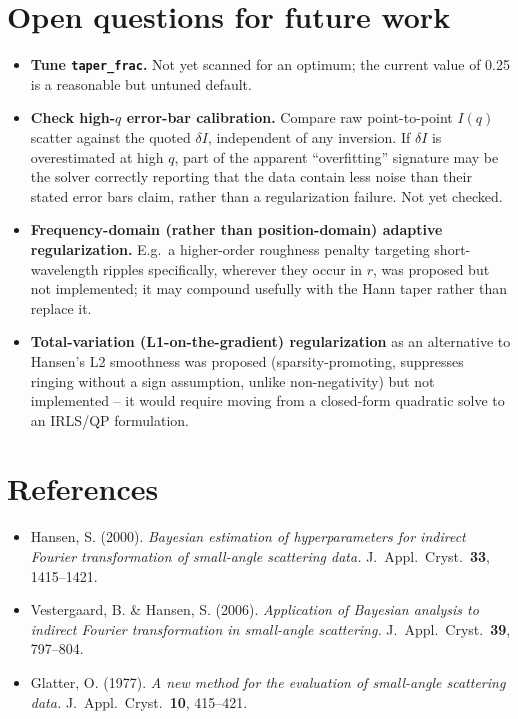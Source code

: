 \documentclass[11pt,a4paper]{article}
\begin{document}
\section{Open questions for future work}
\label{sec:future}

\begin{itemize}[nosep]
  \item \textbf{Tune \texttt{taper\_frac}.} Not yet scanned for an
    optimum; the current value of 0.25 is a reasonable but untuned
    default.
  \item \textbf{Check high-$q$ error-bar calibration.} Compare raw
    point-to-point $I(q)$ scatter against the quoted $\delta I$,
    independent of any inversion. If $\delta I$ is overestimated at
    high $q$, part of the apparent ``overfitting'' signature may be
    the solver correctly reporting that the data contain less noise
    than their stated error bars claim, rather than a regularization
    failure. Not yet checked.
  \item \textbf{Frequency-domain (rather than position-domain) adaptive
    regularization.} E.g.\ a higher-order roughness penalty targeting
    short-wavelength ripples specifically, wherever they occur in $r$,
    was proposed but not implemented; it may compound usefully with
    the Hann taper rather than replace it.
  \item \textbf{Total-variation (L1-on-the-gradient) regularization}
    as an alternative to Hansen's L2 smoothness was proposed
    (sparsity-promoting, suppresses ringing without a sign assumption,
    unlike non-negativity) but not implemented -- it would require
    moving from a closed-form quadratic solve to an IRLS/QP
    formulation.
\end{itemize}

\section*{References}
\begin{itemize}[nosep]
  \item Hansen, S. (2000). \emph{Bayesian estimation of hyperparameters
    for indirect Fourier transformation of small-angle scattering
    data.} J.\ Appl.\ Cryst.\ \textbf{33}, 1415--1421.
  \item Vestergaard, B. \& Hansen, S. (2006). \emph{Application of
    Bayesian analysis to indirect Fourier transformation in
    small-angle scattering.} J.\ Appl.\ Cryst.\ \textbf{39}, 797--804.
  \item Glatter, O. (1977). \emph{A new method for the evaluation of
    small-angle scattering data.} J.\ Appl.\ Cryst.\ \textbf{10},
    415--421.
\end{itemize}
\end{document}
